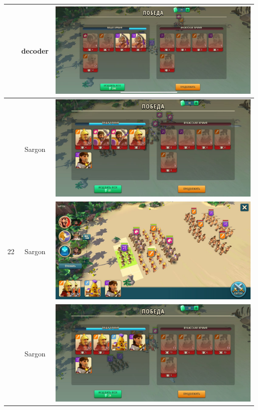 \begin{longtable}{|c|c|c|}
    & decoder &
    \includegraphics[width=0.75\linewidth]{./parts/media/TreasureHunt/22/decoder/photo_2022-04-06_18-09-25.jpg} \\
    \hline
    \multirow{4}{*}{22} & Sargon &
    \includegraphics[width=0.75\linewidth]{./parts/media/TreasureHunt/22/sargon/photo_2022-04-06_18-12-13.jpg} \\
    & Sargon &
    \includegraphics[width=0.75\linewidth]{./parts/media/TreasureHunt/22/sargon/photo_2022-04-06_18-12-03.jpg} \\
    \hline
    \multirow{2}{*}{23} & Sargon &
    \includegraphics[width=0.75\linewidth]{./parts/media/TreasureHunt/23/sargon/photo_2022-04-06_18-12-26.jpg} \\

\end{longtable}
